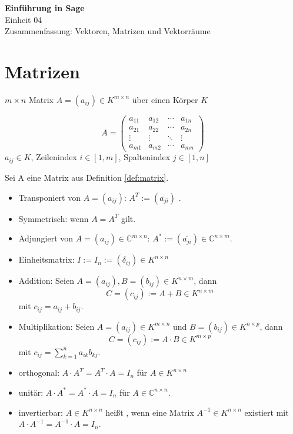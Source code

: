 \documentclass[a4paper,12pt,DIV15]{scrartcl}
\begin{document}
\begin{center}
    \textbf{\LARGE Einführung in Sage}\\
    {\large Einheit 04}\\
    {\large Zusammenfassung: Vektoren, Matrizen und Vektorräume}
\end{center}

\section{Matrizen}

\begin{defn}[Matrix]
    \label{def:matrix}
{\color{red} $m \times n$ Matrix} $A=(a_{ij}) \in K^{m\times n}$ über einen Körper $K$ 

\[ A = \left( \begin{array}{cccc}
a_{11} & a_{12} & \cdots & a_{1n} \\
a_{21} & a_{22} & \cdots & a_{2n} \\
\vdots & \vdots & \ddots & \vdots \\
a_{m1} & a_{m2} & \cdots & a_{mn} 
\end{array} \right) \] 
$a_{ij} \in K$, Zeilenindex $i \in [1,m]$, Spaltenindex $j \in [1,n]$
\end{defn}

\begin{defn} 
    Sei A eine Matrix aus Definition \ref{def:matrix}.
\begin{itemize}
\item {\color{red} Transponiert} von $A=(a_{ij})$: $A^T:=(a_{ji})$ .
\item {\color{red} Symmetrisch}: wenn $A=A^T$ gilt.
\item {\color{red} Adjungiert} von $A=(a_{ij})\in \mathbb{C}^{m\times n}$: $A^* :=
(\overline{a_{ji}}) \in \mathbb{C}^{n \times m}$.
\item {\color{red} Einheitsmatrix}: $I:=I_n:=(\delta_{ij}) \in K^{n \times
n}$
\item {\color{red} Addition}: Seien $A=(a_{ij}),B=(b_{ij}) \in {K}^{n \times m}$, dann
\[ C=(c_{ij}):=A+B \in {K}^{n \times m} \]
mit $c_{ij}=a_{ij}+b_{ij}$.  
\item {\color{red} Multiplikation}: Seien $A=(a_{ij}) \in {K}^{m \times n}$ und $B=(b_{ij})
\in {K}^{n \times p}$, dann 
\[ C=(c_{ij}):=A \cdot B \in{K}^{m \times p} \]
mit $c_{ij}=\sum_{k=1}^n a_{ik} b_{kj}$. 
\item {\color{red} orthogonal}: $A \cdot A^T=A^T \cdot A=I_n$ für $A\in K^{n \times n}$ 
\item {\color{red} unitär}: $A \cdot A^*=A^* \cdot A=I_n$ für $A\in \mathbb{C}^{n \times n}$.
\item {\color{red} invertierbar}: $A\in K^{n \times n}$ heißt , wenn eine
Matrix $A^{-1}\in K^{n \times n}$ existiert mit  $A \cdot
A^{-1}=A^{-1} \cdot A=I_n$.
\end{itemize}
\end{defn} 
\end{document}
